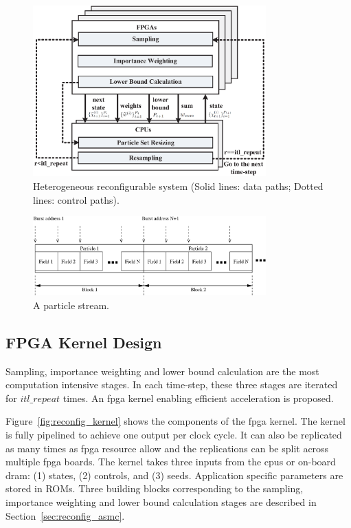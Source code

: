 \begin{figure}[t!]
\centering
\includegraphics[width=0.8\textwidth]{4_adaptation/figures/fig_arch}
\caption[Heterogeneous reconfigurable system]{Heterogeneous reconfigurable system (Solid lines: data paths; Dotted lines: control paths).}
\label{fig:reconfig_arch}
\end{figure}

\begin{figure}[t!]
\centering
\includegraphics[width=0.8\textwidth]{4_adaptation/figures/fig_particles}
\caption{A particle stream.}
\label{fig:particles_stream}
\end{figure}

\subsection{FPGA Kernel Design}
Sampling, importance weighting and lower bound calculation are the most computation intensive stages.
In each time-step, these three stages are iterated for $itl\_repeat$ times.
An \gls{fpga} kernel enabling efficient acceleration is proposed.

Figure~\ref{fig:reconfig_kernel} shows the components of the \gls{fpga} kernel.
The kernel is fully pipelined to achieve one output per clock cycle.
It can also be replicated as many times as \gls{fpga} resource allow and the replications can be split across multiple \gls{fpga} boards.
The kernel takes three inputs from the \glspl{cpu} or on-board \gls{dram}: (1) states, (2) controls, and (3) seeds.
Application specific parameters are stored in ROMs.
Three building blocks corresponding to the sampling, importance weighting and lower bound calculation stages are described in Section~\ref{sec:reconfig_asmc}.

